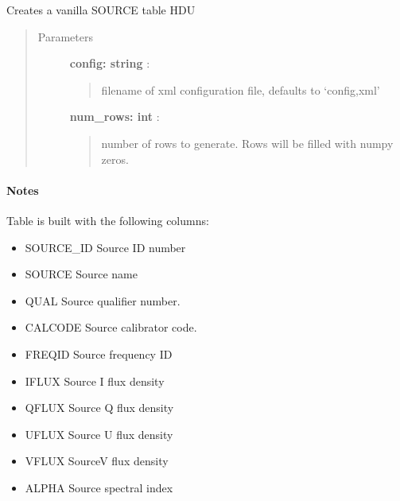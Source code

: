 \documentclass[letterpaper,10pt,english]{sphinxmanual}
\begin{document}
\begin{fulllineitems}
\label{index:pyFitsidi.make_source}
Creates a vanilla SOURCE table HDU
\begin{quote}\begin{description}
\item[{Parameters }] \leavevmode
\textbf{config: string} :
\begin{quote}

filename of xml configuration file, defaults to `config,xml'
\end{quote}

\textbf{num\_rows: int} :
\begin{quote}

number of rows to generate. Rows will be filled with numpy zeros.
\end{quote}

\end{description}\end{quote}
\paragraph{Notes}

Table is built with the following columns:
\begin{itemize}
\item {} 
SOURCE\_ID Source ID number

\item {} 
SOURCE    Source name

\item {} 
QUAL      Source qualifier number.

\item {} 
CALCODE   Source calibrator code.

\item {} 
FREQID    Source frequency ID

\item {} 
IFLUX     Source I flux density

\item {} 
QFLUX     Source Q flux density

\item {} 
UFLUX     Source U flux density

\item {} 
VFLUX     SourceV flux density

\item {} 
ALPHA     Source spectral index


\end{itemize}
\end{fulllineitems}
\end{document}
